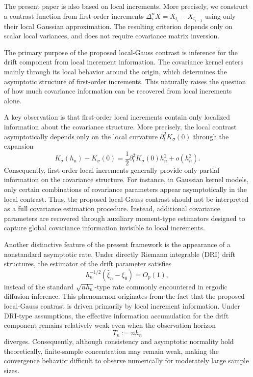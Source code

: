 \documentclass[a4paper,10pt,twoside]{article}
\numberwithin{equation}{section}
\def\p{\partial}
\begin{document}
The present paper is also based on local increments.
More precisely, we construct a contrast function from first-order increments $\Delta_i^nX=X_{t_i}-X_{t_{i-1}}$ using only their local Gaussian approximation.
The resulting criterion depends only on scalar local variances, and does not require covariance matrix inversion. 

The primary purpose of the proposed local-Gauss contrast is inference for the drift component from local increment information.
The covariance kernel enters mainly through its local behavior around the origin, which determines the asymptotic structure of first-order increments.
This naturally raises the question of how much covariance information can be recovered from local increments alone.

A key observation is that first-order local increments contain only localized information about the covariance structure.
More precisely, the local contrast asymptotically depends only on the local curvature $\p_t^2K_\sigma(0)$ through the expansion
\[
K_\sigma(h_n)-K_\sigma(0)
=
\frac12\p_t^2K_\sigma(0)h_n^2 + o(h_n^2).
\]
Consequently, first-order local increments generally provide only partial information on the covariance structure.
For instance, in Gaussian kernel models, only certain combinations of covariance parameters appear asymptotically in the local contrast.
Thus, the proposed local-Gauss contrast should not be interpreted as a full covariance estimation procedure.
Instead, additional covariance parameters are recovered through auxiliary moment-type estimators designed to capture global covariance information invisible to local increments.

Another distinctive feature of the present framework is the appearance of a nonstandard asymptotic rate.
Under directly Riemann integrable (DRI) drift structures, the estimator of the drift parameter satisfies
\[
h_n^{-1/2}(\widehat{\xi}_n-\xi_0)=O_p(1),
\]
instead of the standard $\sqrt{nh_n}$-type rate commonly encountered in ergodic diffusion inference.
This phenomenon originates from the fact that the proposed local-Gauss contrast is driven primarily by local increment information.
Under DRI-type assumptions, the effective information accumulation for the drift component remains relatively weak even when the observation horizon
\[
T_n := nh_n
\]
diverges.
Consequently, although consistency and asymptotic normality hold theoretically, finite-sample concentration may remain weak, making the convergence behavior difficult to observe numerically for moderately large sample sizes.
\end{document}
